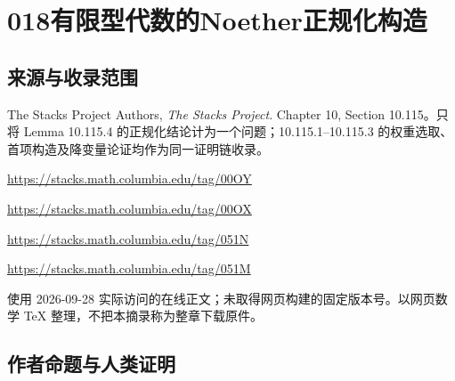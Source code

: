 \documentclass[UTF8,11pt]{ctexart}
\theoremstyle{definition}
\begin{document}
\section*{018\quad 有限型代数的Noether正规化构造}
\subsection*{来源与收录范围}
The Stacks Project Authors, \emph{The Stacks Project}. Chapter 10, Section 10.115。只将 Lemma 10.115.4 的正规化结论计为一个问题；10.115.1--10.115.3 的权重选取、首项构造及降变量论证均作为同一证明链收录。
\par\url{https://stacks.math.columbia.edu/tag/00OY}
\par\url{https://stacks.math.columbia.edu/tag/00OX}
\par\url{https://stacks.math.columbia.edu/tag/051N}
\par\url{https://stacks.math.columbia.edu/tag/051M}
\par 使用 2026-09-28 实际访问的在线正文；未取得网页构建的固定版本号。以网页数学 TeX 整理，不把本摘录称为整章下载原件。
\subsection*{作者命题与人类证明}
\end{document}
